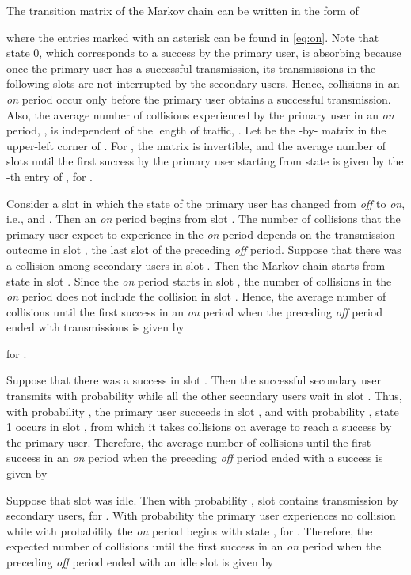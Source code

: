 \documentclass[12pt,draftclsnofoot,onecolumn]{IEEEtran}
\begin{document}
The transition matrix of the Markov chain can be written in the form of

where the entries marked with an asterisk can be found in \eqref{eq:on}.
Note that state 0, which corresponds to a success by the primary user,
is absorbing because once the primary user has a successful transmission,
its transmissions in the following slots are not interrupted by the secondary users.
Hence, collisions in an \emph{on} period occur only before the primary
user obtains a successful transmission. Also,
the average number of collisions experienced by the primary
user in an \emph{on} period, ,
is independent of the length of traffic, .
Let  be the -by- matrix in the upper-left corner of .
For , the matrix  is invertible, and
the average number of slots until the first success by the primary user starting from
state  is given by the -th entry of
, for .

Consider a slot  in which the state of the primary user has changed from \emph{off} to \emph{on},
i.e.,  and .
Then an \emph{on} period begins from slot .
The number of collisions that the primary user
expect to experience in the \emph{on} period depends on the transmission outcome in slot ,
the last slot of the preceding \emph{off} period.
Suppose that there was a collision among  secondary users in slot .
Then the Markov chain starts from state  in slot .
Since the \emph{on} period starts in slot , the number of collisions in the \emph{on} period does not include
the collision in slot . Hence, the average number of collisions
until the first success in an \emph{on} period when the preceding \emph{off} period
ended with  transmissions is given by

for .

Suppose that there was a success in slot . Then the successful secondary user transmits
with probability  while all the other secondary users wait in slot .
Thus, with probability , the primary user succeeds in slot ,
and with probability , state 1 occurs in slot , from which
it takes  collisions
on average to reach a success by the primary user. Therefore,
the average number of collisions
until the first success in an \emph{on} period when the preceding \emph{off} period
ended with a success is given by


Suppose that slot  was idle. Then
with probability , slot  contains transmission by  secondary users, for .
With probability  the primary user experiences no collision while
with probability  the \emph{on} period begins with state ,
for . Therefore,
the expected number of collisions
until the first success in an \emph{on} period when the preceding \emph{off} period
ended with an idle slot is given by
\end{document}
